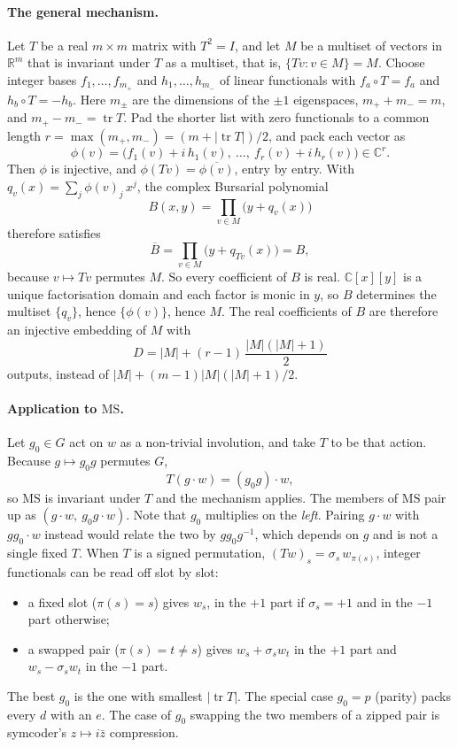 \documentclass[11pt]{article}
\theoremstyle{definition}
\theoremstyle{remark}
\newcommand{\MS}{\mathrm{MS}}
\begin{document}
\paragraph{The general mechanism.}
Let $T$ be a real $m \times m$ matrix with $T^2 = I$, and let $M$ be a multiset
of vectors in $\mathbb{R}^m$ that is invariant under $T$ as a multiset, that
is, $\{T v : v \in M\} = M$. Choose integer bases
$f_1, \ldots, f_{m_+}$ and $h_1, \ldots, h_{m_-}$ of linear functionals with
$f_a \circ T = f_a$ and $h_b \circ T = -h_b$. Here $m_\pm$ are the dimensions of
the $\pm 1$ eigenspaces, $m_+ + m_- = m$, and $m_+ - m_- = \operatorname{tr} T$.
Pad the shorter list with zero functionals to a common length
$r = \max(m_+, m_-) = (m + |\operatorname{tr} T|)/2$, and pack each vector as
\[
  \phi(v) = \bigl( f_1(v) + i\,h_1(v),\ \ldots,\ f_r(v) + i\,h_r(v) \bigr) \in \mathbb{C}^r .
\]
Then $\phi$ is injective, and $\phi(Tv) = \overline{\phi(v)}$, entry by entry. With
$q_v(x) = \sum_j \phi(v)_j\, x^j$, the complex Bursarial polynomial
\[
  B(x, y) = \prod_{v \in M} \bigl( y + q_v(x) \bigr)
\]
therefore satisfies
\[
  \overline{B} = \prod_{v \in M} \bigl( y + q_{Tv}(x) \bigr) = B ,
\]
because $v \mapsto Tv$ permutes $M$. So every coefficient of $B$ is real.
$\mathbb{C}[x][y]$ is a unique factorisation domain and each factor is monic in
$y$, so $B$ determines the multiset $\{q_v\}$, hence $\{\phi(v)\}$, hence $M$.
The real coefficients of $B$ are therefore an injective embedding of $M$ with
\[
  D = |M| + (r - 1)\,\frac{|M|(|M| + 1)}{2}
\]
outputs, instead of $|M| + (m - 1)|M|(|M| + 1)/2$.

\paragraph{Application to $\MS$.}
Let $g_0 \in G$ act on $w$ as a non-trivial involution, and take $T$ to be that
action. Because $g \mapsto g_0 g$ permutes $G$,
\[
  T(g \cdot w) = (g_0 g) \cdot w ,
\]
so $\MS$ is invariant under $T$ and the mechanism applies. The members of
$\MS$ pair up as $(g \cdot w,\ g_0 g \cdot w)$. Note that $g_0$ multiplies on the
\emph{left}. Pairing $g \cdot w$ with $g g_0 \cdot w$ instead would relate the
two by $g g_0 g^{-1}$, which depends on $g$ and is not a single fixed $T$. When
$T$ is a signed permutation, $(Tw)_s = \sigma_s\, w_{\pi(s)}$, integer
functionals can be read off slot by slot:
\begin{itemize}
  \item a fixed slot ($\pi(s) = s$) gives $w_s$, in the $+1$ part if
    $\sigma_s = +1$ and in the $-1$ part otherwise;
  \item a swapped pair ($\pi(s) = t \ne s$) gives $w_s + \sigma_s w_t$ in the
    $+1$ part and $w_s - \sigma_s w_t$ in the $-1$ part.
\end{itemize}
The best $g_0$ is the one with smallest $|\operatorname{tr} T|$. The special case
$g_0 = p$ (parity) packs every $d$ with an $e$. The case of $g_0$ swapping the
two members of a zipped pair is symcoder's $z \mapsto i\bar z$ compression.
\end{document}
